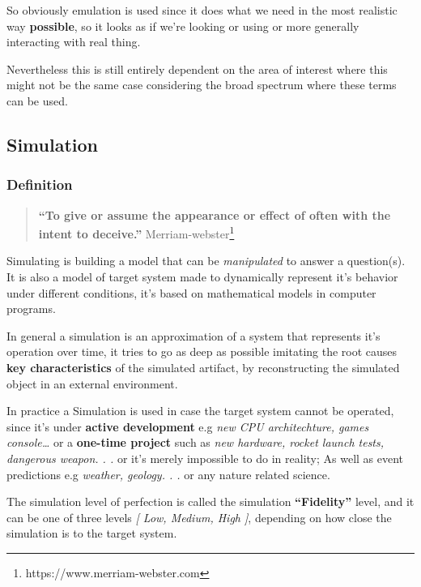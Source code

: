 \documentclass[
  14pt,
  english,
  a4paper,
]{scrreprt}
\begin{document}
So obviously emulation is used since it does what we need in the most
realistic way \textbf{possible}, so it looks as if we're looking or
using or more generally interacting with real thing.

Nevertheless this is still entirely dependent on the area of interest
where this might not be the same case considering the broad spectrum
where these terms can be used.

\hypertarget{simulation}{%
\subsection{Simulation}\label{simulation}}

\hypertarget{definition}{%
\subsubsection{Definition}\label{definition}}

\begin{quote}
\textbf{``To give or assume the appearance or effect of often with the
intent to deceive.''} Merriam-webster\footnote{https://www.merriam-webster.com}
\end{quote}

Simulating is building a model that can be \emph{manipulated} to answer
a question(s). It is also a model of target system made to dynamically
represent it's behavior under different conditions, it's based on
mathematical models in computer programs.

In general a simulation is an approximation of a system that represents
it's operation over time, it tries to go as deep as possible imitating
the root causes \textbf{key characteristics} of the simulated artifact,
by reconstructing the simulated object in an external environment.

In practice a Simulation is used in case the target system cannot be
operated, since it's under \textbf{active development} e.g \emph{new CPU
architechture, games console\ldots{}} or a \textbf{one-time project}
such as \emph{new hardware, rocket launch tests, dangerous weapon. . .}
or it's merely impossible to do in reality; As well as event predictions
e.g \emph{weather, geology. . .} or any nature related science.

The simulation level of perfection is called the simulation
\textbf{``Fidelity''} level, and it can be one of three levels \emph{{[}
Low, Medium, High {]}}, depending on how close the simulation is to the
target system.
\end{document}
